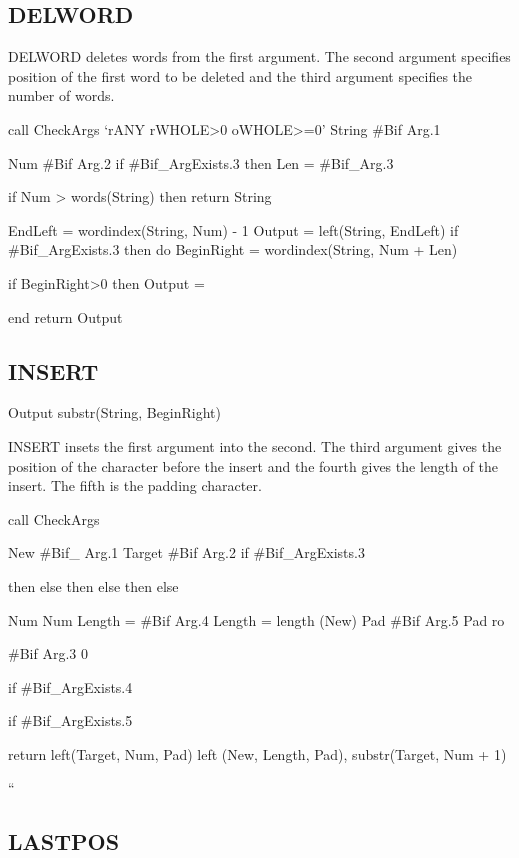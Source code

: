 \hypertarget{delword}{%
\subsection{DELWORD}\label{delword}}

DELWORD deletes words from the first argument. The second argument
specifies position of the first word to be deleted and the third
argument specifies the number of words.

call CheckArgs `rANY rWHOLE\textgreater0 oWHOLE\textgreater=0' String
\#Bif Arg.1

Num \#Bif Arg.2 if \#Bif\_ArgExists.3 then Len = \#Bif\_Arg.3

if Num \textgreater{} words(String) then return String

EndLeft = wordindex(String, Num) - 1 Output = left(String, EndLeft) if
\#Bif\_ArgExists.3 then do BeginRight = wordindex(String, Num + Len)

if BeginRight\textgreater0 then Output =

end return Output

\hypertarget{insert}{%
\subsection{INSERT}\label{insert}}

Output \textbar\textbar{} substr(String, BeginRight)

INSERT insets the first argument into the second. The third argument
gives the position of the character before the insert and the fourth
gives the length of the insert. The fifth is the padding character.

call CheckArgs

New \#Bif\_ Arg.1 Target \#Bif Arg.2 if \#Bif\_ArgExists.3

then else then else then else

Num Num Length = \#Bif Arg.4 Length = length (New) Pad \#Bif Arg.5 Pad
ro

\#Bif Arg.3 0

if \#Bif\_ArgExists.4

if \#Bif\_ArgExists.5

return left(Target, Num, Pad) left (New, Length, Pad), substr(Target,
Num + 1)

``

\hypertarget{lastpos}{%
\subsection{LASTPOS}\label{lastpos}}

